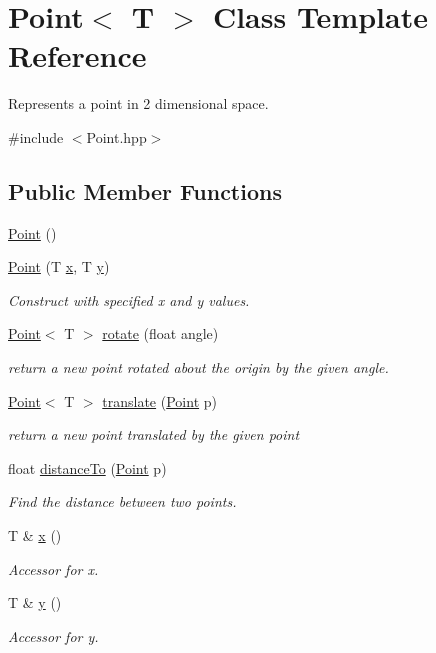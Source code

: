 \hypertarget{classPoint}{\section{Point$<$ T $>$ Class Template Reference}
\label{classPoint}
}


Represents a point in 2 dimensional space.  




{\ttfamily \#include $<$Point.\-hpp$>$}

\subsection*{Public Member Functions}
\begin{DoxyCompactItemize}
\item 
\hyperlink{classPoint_aea76b1130f1a203722d8f2254ced8e66}{Point} ()
\item 
\hyperlink{classPoint_a4236452aa9c9f4cffc58b04180fea343}{Point} (T \hyperlink{classPoint_a97a274fff44375b5d60e209f26d7382f}{x}, T \hyperlink{classPoint_a71672fd35753d43129ff157127dba575}{y})
\begin{DoxyCompactList}\small\item\em Construct with specified x and y values. \end{DoxyCompactList}\item 
\hyperlink{classPoint}{Point}$<$ T $>$ \hyperlink{classPoint_a21b0a6ce6c6041b23604a27121786902}{rotate} (float angle)
\begin{DoxyCompactList}\small\item\em return a new point rotated about the origin by the given angle. \end{DoxyCompactList}\item 
\hyperlink{classPoint}{Point}$<$ T $>$ \hyperlink{classPoint_a5b03fdd5ae61621155265d59502a1beb}{translate} (\hyperlink{classPoint}{Point} p)
\begin{DoxyCompactList}\small\item\em return a new point translated by the given point \end{DoxyCompactList}\item 
float \hyperlink{classPoint_a02969e7eccf9468f0b1d9572ae0800c9}{distance\-To} (\hyperlink{classPoint}{Point} p)
\begin{DoxyCompactList}\small\item\em Find the distance between two points. \end{DoxyCompactList}\item 
T \& \hyperlink{classPoint_a97a274fff44375b5d60e209f26d7382f}{x} ()
\begin{DoxyCompactList}\small\item\em Accessor for x. \end{DoxyCompactList}\item 
T \& \hyperlink{classPoint_a71672fd35753d43129ff157127dba575}{y} ()
\begin{DoxyCompactList}\small\item\em Accessor for y. \end{DoxyCompactList}\end{DoxyCompactItemize}
